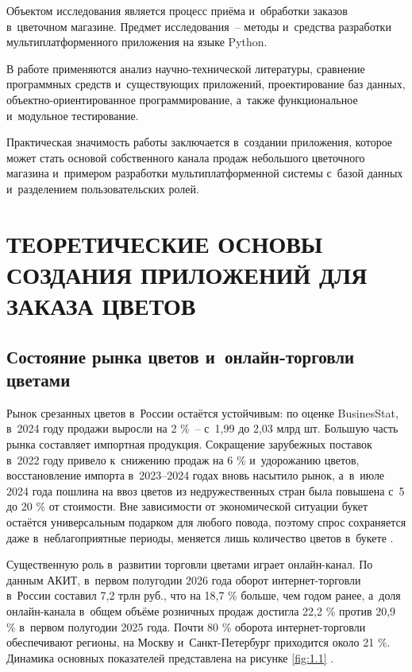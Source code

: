 \documentclass[14pt,a4paper]{extarticle}
\begin{document}
Объектом исследования является процесс приёма и~обработки заказов в~цветочном магазине. Предмет исследования~– методы и~средства разработки мультиплатформенного приложения на языке Python.



В работе применяются анализ научно-технической литературы, сравнение программных средств и~существующих приложений, проектирование баз данных, объектно-ориентированное программирование, а~также функциональное и~модульное тестирование.



Практическая значимость работы заключается в~создании приложения, которое может стать основой собственного канала продаж небольшого цветочного магазина и~примером разработки мультиплатформенной системы с~базой данных и~разделением пользовательских ролей.



\clearpage

\section{ТЕОРЕТИЧЕСКИЕ ОСНОВЫ СОЗДАНИЯ ПРИЛОЖЕНИЙ ДЛЯ ЗАКАЗА ЦВЕТОВ}

\subsection{Состояние рынка цветов и~онлайн-торговли цветами}

Рынок срезанных цветов в~России остаётся устойчивым: по оценке BusinesStat, в~2024 году продажи выросли на 2 \%~– с~1,99 до 2,03 млрд шт. Большую часть рынка составляет импортная продукция. Сокращение зарубежных поставок в~2022 году привело к~снижению продаж на 6 \% и~удорожанию цветов, восстановление импорта в~2023–2024 годах вновь насытило рынок, а~в~июле 2024 года пошлина на ввоз цветов из недружественных стран была повышена с~5 до 20 \% от стоимости. Вне зависимости от экономической ситуации букет остаётся универсальным подарком для любого повода, поэтому спрос сохраняется даже в~неблагоприятные периоды, меняется лишь количество цветов в~букете \cite{b9}.



Существенную роль в~развитии торговли цветами играет онлайн-канал. По данным АКИТ, в~первом полугодии 2026 года оборот интернет-торговли в~России составил 7,2 трлн руб., что на 18,7 \% больше, чем годом ранее, а~доля онлайн-канала в~общем объёме розничных продаж достигла 22,2 \% против 20,9 \% в~первом полугодии 2025 года. Почти 80 \% оборота интернет-торговли обеспечивают регионы, на Москву и~Санкт-Петербург приходится около 21 \%. Динамика основных показателей представлена на рисунке \ref{fig:1.1} \cite{b10}.
\end{document}
